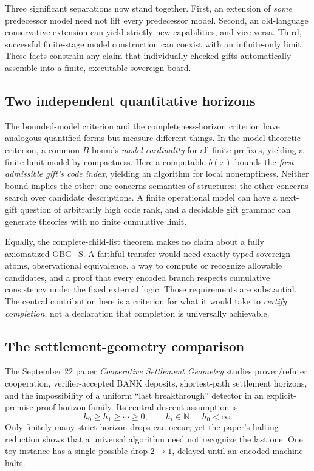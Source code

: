 \documentclass[11pt,letterpaper]{article}
\theoremstyle{definition}\newtheorem{definition}[theorem]{Definition}\newtheorem{example}[theorem]{Example}
\theoremstyle{remark}\newtheorem{remark}[theorem]{Remark}
\begin{document}
Three significant separations now stand together. First, an extension of \emph{some} predecessor model need not lift every predecessor model. Second, an old-language conservative extension can yield strictly new capabilities, and vice versa. Third, successful finite-stage model construction can coexist with an infinite-only limit. These facts constrain any claim that individually checked gifts automatically assemble into a finite, executable sovereign board.


\subsection{Two independent quantitative horizons}
The bounded-model criterion and the completeness-horizon criterion have analogous quantified forms but measure different things. In the model-theoretic criterion, a common $B$ bounds \emph{model cardinality} for all finite prefixes, yielding a finite limit model by compactness. Here a computable $b(x)$ bounds the \emph{first admissible gift's code index}, yielding an algorithm for local nonemptiness. Neither bound implies the other: one concerns semantics of structures; the other concerns search over candidate descriptions. A finite operational model can have a next-gift question of arbitrarily high code rank, and a decidable gift grammar can generate theories with no finite cumulative limit.

Equally, the complete-child-list theorem makes no claim about a fully axiomatized GBG+S. A faithful transfer would need exactly typed sovereign atoms, observational equivalence, a way to compute or recognize allowable candidates, and a proof that every encoded branch respects cumulative consistency under the fixed external logic. Those requirements are substantial. The central contribution here is a criterion for what it would take to \emph{certify completion}, not a declaration that completion is universally achievable.


\subsection{The settlement-geometry comparison}
The September 22 paper \emph{Cooperative Settlement Geometry} \cite{coop} studies prover/refuter cooperation, verifier-accepted BANK deposits, shortest-path settlement horizons, and the impossibility of a uniform ``last breakthrough'' detector in an explicit-premise proof-horizon family. Its central descent assumption is
\[
h_0\ge h_1\ge\cdots\ge0,\qquad h_i\in\mathbb N,\quad h_0<\infty.
\]
Only finitely many strict horizon drops can occur; yet the paper's halting reduction shows that a universal algorithm need not recognize the last one. One toy instance has a single possible drop $2\to1$, delayed until an encoded machine halts.
\end{document}
